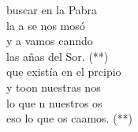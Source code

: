 \documentclass[12pt]{article}
\begin{document}
\begin{multicols*}{2}
\begin{cancion}%
	 buscar en la Pabra\\
	la a se nos mosó\\
	y a  vamos canndo \\
	las añas del Sor. (**) \\
\jump
	 que existía en el prcipio \\
	y toon nuestras nos\\
	lo que n nuestros os \\
	eso lo que os caamos. (**)\\
\end{cancion}%


\end{multicols*}
\end{document}
